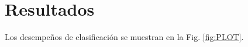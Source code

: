 



















\section{Resultados}

Los desempeños de clasificación se muestran en la Fig. \ref{fig:PLOT}. 

